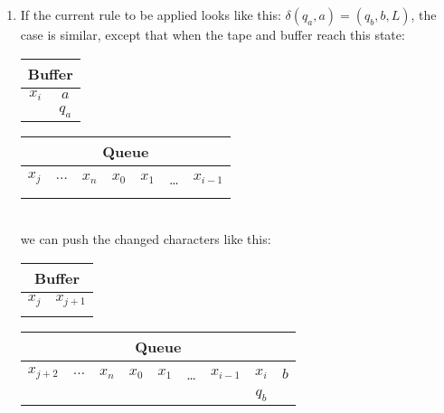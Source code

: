 \documentclass{article}
\begin{document}
\begin{enumerate}
\begin{enumerate}
    
  \item If the current rule to be applied looks like this:
    $\delta(q_a,a) = (q_b,b,L)$, the case is similar, except that when
    the tape and buffer reach this state:\\
\begin{tabular}{|c|c|}\hline
  \multicolumn{2}{|c|}{Buffer}\\\hline
  $x_i$   & $a$ \\
&  $q_a$\\\hline
\end{tabular}
\begin{tabular}{|c|c|c|c|c|c|c|}\hline
  \multicolumn{7}{|c|}{Queue}\\\hline
 $x_j$& $\ldots$ & $x_n$ & $x_0$ & $x_1$ &  \ldots &$x_{i-1}$ \\
&           &    & &    && \\\hline
\end{tabular}\\
we can push the changed characters like this:\\
\begin{tabular}{|c|c|}\hline
  \multicolumn{2}{|c|}{Buffer}\\\hline
  $x_j$   & $x_{j+1}$ \\
  &\\\hline
\end{tabular}
\begin{tabular}{|c|c|c|c|c|c|c|c|c|}\hline
  \multicolumn{9}{|c|}{Queue}\\\hline
 $x_{j+2}$& $\ldots$ & $x_n$ & $x_0$ & $x_1$ &  \ldots&$x_{i-1}$  & $x_i$  & $b$\\
&           &    & &    && & $q_b$ &\\\hline
\end{tabular}\\
    


\end{enumerate}

\end{enumerate}
\end{document}
